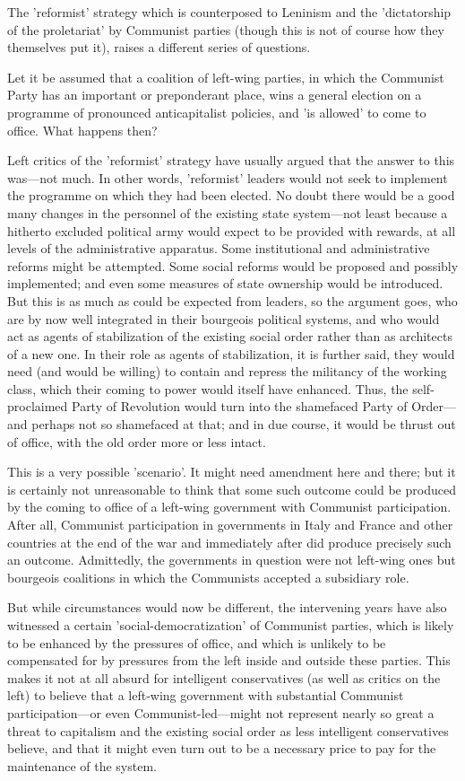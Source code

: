 The 'reformist' strategy which is counterposed to Leninism and the 'dictatorship of the proletariat' by Communist parties (though this is not of course how they themselves put it), raises a different series of questions.

Let it be assumed that a coalition of left-wing parties, in which the Communist Party has an important or preponderant place, wins a general election on a programme of pronounced anticapitalist policies, and 'is allowed' to come to office. What happens then?

Left critics of the 'reformist' strategy have usually argued that the answer to this was—not much. In other words, 'reformist' leaders would not seek to implement the programme on which they had been elected. No doubt there would be a good many changes in the personnel of the existing state system—not least because a hitherto excluded political army would expect to be provided with rewards, at all levels of the administrative apparatus. Some institutional and administrative reforms might be attempted. Some social reforms would be proposed and possibly implemented; and even some measures of state ownership would be introduced. But this is as much as could be expected from leaders, so the argument goes, who are by now well integrated in their bourgeois political systems, and who would act as agents of stabilization of the existing social order rather than as architects of a new one. In their role as agents of stabilization, it is further said, they would need (and would be willing) to contain and repress the militancy of the working class, which their coming to power would itself have enhanced. Thus, the self-proclaimed Party of Revolution would turn into the shamefaced Party of Order—and perhaps not so shamefaced at that; and in due course, it would be thrust out of office, with the old order more or less intact.

This is a very possible 'scenario'. It might need amendment here and there; but it is certainly not unreasonable to think that some such outcome could be produced by the coming to office of a left-wing government with Communist participation. After all, Communist participation in governments in Italy and France and other countries at the end of the war and immediately after did produce precisely such an outcome. Admittedly, the governments in question were not left-wing ones but bourgeois coalitions in which the Communists accepted a subsidiary role.

But while circumstances would now be different, the intervening years have also witnessed a certain 'social-democratization' of Communist parties, which is likely to be enhanced by the pressures of office, and which is unlikely to be compensated for by pressures from the left inside and outside these parties. This makes it not at all absurd for intelligent conservatives (as well as critics on the left) to believe that a left-wing government with substantial Communist participation—or even Communist\hyp{}led—might not represent nearly so great a threat to capitalism and the existing social order as less intelligent conservatives believe, and that it might even turn out to be a necessary price to pay for the maintenance of the system.

